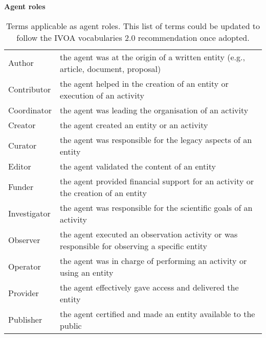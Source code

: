 
\begin{table}[ht]
\small
{}\textwidth
\textbf{\normalsize Agent roles}\vspace{0.25em}\\
\begin{tabulary}{1.0\textwidth}{lp{8cm}}
\toprule
{} &  \\
\midrule
Author      & the agent was at the origin of a written entity (e.g., article, document, proposal) \\
Contributor & the agent helped in the creation of an entity or execution of an activity \\
Coordinator & the agent was leading the organisation of an activity \\
Creator     & the agent created an entity or an activity \\
Curator     & the agent was responsible for the legacy aspects of an entity \\
Editor      & the agent validated the content of an entity \\
Funder      & the agent provided financial support for an activity or the creation of an entity \\
Investigator & the agent was responsible for the scientific goals of an activity \\
Observer    & the agent executed an observation activity or was responsible for observing a specific entity \\
Operator    & the agent was in charge of performing an activity or using an entity \\
Provider    & the agent effectively gave access and delivered the entity \\
Publisher   & the agent certified and made an entity available to the public \\
\bottomrule
\end{tabulary}
\caption[Terms applicable as agent roles.]{Terms applicable as agent roles. This list of terms could be updated to follow the IVOA vocabularies 2.0 recommendation once adopted.}
\label{tab:agent-roles}
\end{table}




